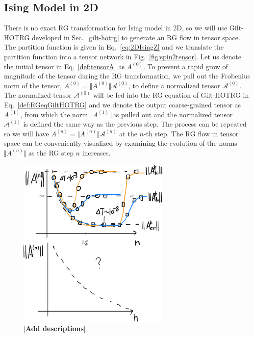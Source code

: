\documentclass[aps,prb,reprint,superscriptaddress]{revtex4-2}
\begin{document}
\subsection{Ising Model in 2D\label{benchmark:2DIsing}}
There is no exact RG transformation for Ising model in 2D, so we will
use Gilt-HOTRG developed in Sec.~\ref{gilt-hotrg} to generate an RG flow
in tensor space. The partition function is given in
Eq.~\eqref{eq:2DIsingZ} and we translate the partition function into
a tensor network in Fig.~\ref{fig:spin2tensor}. Let us denote the
initial tensor in Eq.~\eqref{def:tensorA} as $A^{(0)}$. To prevent a
rapid grow of magnitude of the tensor during the RG transformation, we
pull out the Frobenius norm of the tensor, $A^{(0)} = \Vert
A^{(0)}\Vert \mathcal{A}^{(0)}$, to define a normalized tensor
$\mathcal{A}^{(0)}$. The normalized tensor $\mathcal{A}^{(0)}$ will be
fed into the RG equation of Gilt-HOTRG in Eq.~\eqref{def:RGeqGiltHOTRG}
and we denote the output coarse-grained tensor as $A^{(1)}$, from which
the norm $\Vert A^{(1)}\Vert$ is pulled out and the normalized tensor
$\mathcal{A}^{(1)}$ is defined the same way as the previous step. The
process can be repeated so we will have $A^{(n)} = \Vert A^{(n)}\Vert
\mathcal{A}^{(n)}$ at the $n$-th step. The RG flow in tensor space can
be conveniently visualized by examining the evolution of the norms
$\Vert A^{(n)}\Vert$ as the RG step $n$ increases.
\begin{figure}[htb]
    \includegraphics[width=7.5cm]{./figs/flowAnorm}
    \caption{\label{fig:flowAnorm}[\textbf{Add descriptions}]}
\end{figure}
%
\end{document}
